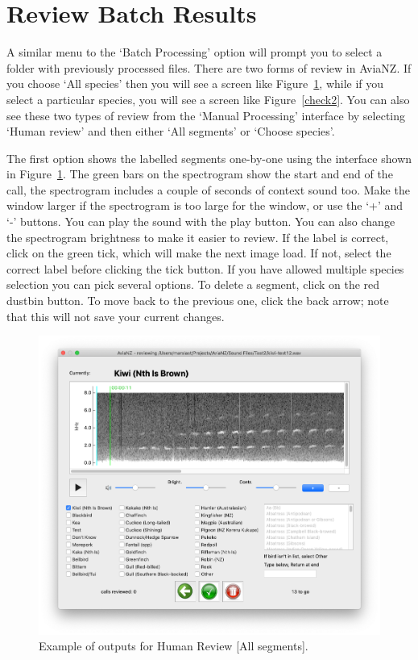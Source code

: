 \documentclass{article}
\begin{document}
\section{Review Batch Results}\label{sec:review}

A similar menu to the `Batch Processing' option will prompt you to select a folder with previously processed files. There are two forms of review in AviaNZ. 
If you choose `All species' then you will see a screen like Figure~\ref{check1}, while if you select a particular species, you will see a screen like Figure~\ref{check2}. You can also see these two types of review from the `Manual Processing' interface by selecting `Human review' and then either `All segments' or `Choose species'. 

The first option shows the labelled segments one-by-one using the interface shown in Figure~\ref{check1}. 
The green bars on the spectrogram show the start and end of the call, the spectrogram includes a couple of seconds of context sound too. Make the window larger if the spectrogram is too large for the window, or use the `+' and `-' buttons. You can play the sound with the play button. You can also change the spectrogram brightness to make it easier to review. If the label is correct, click on the green tick, which will make the next image load. If not, select the correct label before clicking the tick button. If you have allowed multiple species selection you can pick several options. To delete a segment, click on the red dustbin button. To move back to the previous one, click the back arrow; note that this will not save your current changes. 

	\begin{figure}
	\centering
	\includegraphics[width=.6\textwidth]{Figs/review1}
	\caption{Example of outputs for Human Review [All segments].}
	\label{check1}
	\end{figure}
	
\end{document}
